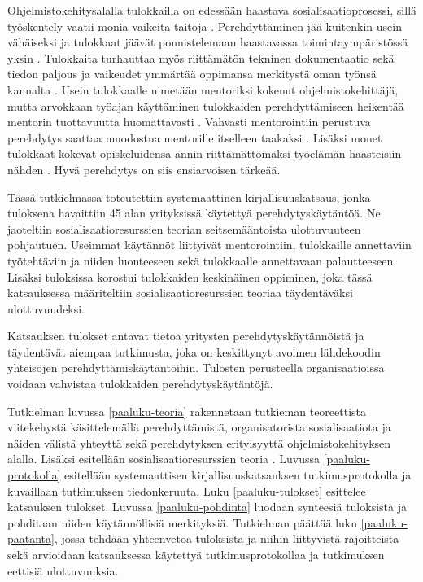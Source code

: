 \documentclass[utf8]{gradu3}
\begin{document}
Ohjelmistokehitysalalla tulokkailla on edessään haastava sosialisaatioprosessi, sillä työskentely vaatii monia vaikeita taitoja
%
\parencites%
    [][]{swebok}%
    {gregory-ym-2020}%
    {begel-simon-2008-all-over-again}%
\relax.
%
Perehdyttäminen jää kuitenkin usein vähäiseksi ja tulokkaat jäävät ponnistelemaan haastavassa toimintaympäristössä yksin %
\parencites%
    {buchan-ym-2019}%
    {dagenais-ym-2010}%
    {begel-simon-2008}%
\relax.
%
Tulokkaita turhauttaa myös riittämätön tekninen dokumentaatio \parencite{ju-ym-2021} sekä tiedon paljous ja vaikeudet ymmärtää oppimansa merkitystä oman työnsä kannalta \parencite{viviani-murphy-2019}. Usein tulokkaalle nimetään mentoriksi kokenut ohjelmistokehittäjä, mutta arvokkaan työajan käyttäminen tulokkaiden perehdyttämiseen heikentää mentorin tuottavuutta huomattavasti \parencite{medeiros-2021}. Vahvasti mentorointiin perustuva perehdytys saattaa muodostua mentorille itselleen taakaksi \parencite{viviani-murphy-2019}. Lisäksi monet tulokkaat kokevat opiskeluidensa annin riittämättömäksi työelämän haasteisiin nähden \parencite{craig-ym-2018}. Hyvä perehdytys on siis ensiarvoisen tärkeää.

Tässä tutkielmassa toteutettiin systemaattinen kirjallisuuskatsaus, jonka tuloksena havaittiin 45 alan yrityksissä käytettyä perehdytyskäytäntöä. Ne jaoteltiin sosialisaatioresurssien teorian \textcite{saks-gruman-2012} seitsemääntoista ulottuvuuteen pohjautuen. Useimmat käytännöt liittyivät mentorointiin, tulokkaille annettaviin työtehtäviin ja niiden luonteeseen sekä tulokkaalle annettavaan palautteeseen. Lisäksi tuloksissa korostui tulokkaiden keskinäinen oppiminen, joka tässä katsauksessa määriteltiin sosialisaatioresurssien teoriaa täydentäväksi ulottuvuudeksi.

Katsauksen tulokset antavat tietoa yritysten perehdytyskäytännöistä ja täydentävät aiempaa tutkimusta, joka on keskittynyt avoimen lähdekoodin yhteisöjen perehdyttämiskäytäntöihin. Tulosten perusteella organisaatioissa voidaan vahvistaa tulokkaiden perehdytyskäytäntöjä.

Tutkielman luvussa \ref{paaluku-teoria} rakennetaan tutkieman teoreettista viitekehystä käsittelemällä perehdyttämistä, organisatorista sosialisaatiota ja näiden välistä yhteyttä sekä perehdytyksen erityisyyttä ohjelmistokehityksen alalla. Lisäksi esitellään sosialisaatioresurssien teoria \parencite{saks-gruman-2012}. Luvussa \ref{paaluku-protokolla} esitellään systemaattisen kirjallisuuskatsauksen tutkimusprotokolla ja kuvaillaan tutkimuksen tiedonkeruuta. Luku \ref{paaluku-tulokset} esittelee katsauksen tulokset. Luvussa \ref{paaluku-pohdinta} luodaan synteesiä tuloksista ja pohditaan niiden käytännöllisiä merkityksiä. Tutkielman päättää luku \ref{paaluku-paatanta}, jossa tehdään yhteenvetoa tuloksista ja niihin liittyvistä rajoitteista sekä arvioidaan katsauksessa käytettyä tutkimusprotokollaa ja tutkimuksen eettisiä ulottuvuuksia.
\end{document}
